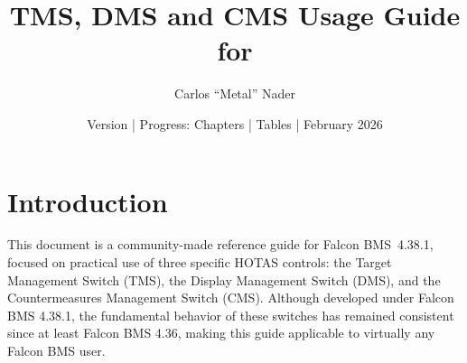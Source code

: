 \documentclass[11pt, a4paper, twoside]{report}
\title{TMS, DMS and CMS Usage Guide for \bmsver}
\author{Carlos ``Metal'' Nader}
\date{Version \fulldocversion{} | Progress: Chapters \chapterscompletedof{} | Tables \tablesfilledpct{} | February 2026}
\providecommand{\bmsver}{Falcon BMS~4.38.1}
\begin{document}
\maketitle


\setcounter{tocdepth}{3}
\setcounter{secnumdepth}{3}

\newpage

\tableofcontents

\newpage



%
%
%


\chapter{Introduction}
\label{chap:C1}

This document is a community-made reference guide for \bmsver, focused on practical use of three specific HOTAS controls: the Target Management Switch (TMS), the Display Management Switch (DMS), and the Countermeasures Management Switch (CMS). Although developed under Falcon BMS 4.38.1, the fundamental behavior of these switches has remained consistent since at least Falcon BMS 4.36, making this guide applicable to virtually any Falcon BMS user.
\end{document}
